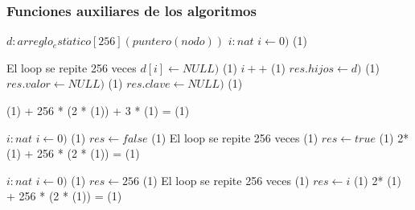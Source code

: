 





\subsubsection{Funciones auxiliares de los algoritmos}

  {
    \var $d : arreglo_est\acute{a}tico[256] (puntero(nodo))$
    \var $i : nat$
    \State $i \gets 0)$                									\comment \bigo(1)

     	\Statex             \comment El loop se repite 256 veces
     	\State $d[i] \gets NULL)$										\comment \bigo(1)
     	\State $i++$   													\comment \bigo(1) 
    \EndWhile						
    \State $res.hijos \gets d)$											\comment \bigo(1) 
    \State $res.valor \gets NULL)$   									\comment \bigo(1)
    \State $res.clave \gets NULL)$                    \comment \bigo(1) 
}{   \bigo(1) + 256 * (2 * \bigo(1)) + 3 * \bigo(1) = \bigo(1) }

  {
    \var $i : nat$
    \State $i \gets 0)$                									\comment \bigo(1)
    \State $res \gets false$										\comment \bigo(1)
     	\Statex             \comment El loop se repite 256 veces
 		                     			\comment \bigo(1)
		 	\State $res \gets true$										\comment \bigo(1)
     	 \EndIf	 													 
    \EndWhile						
}{  2* \bigo(1) + 256 * (2 * \bigo(1))  = \bigo(1) }

  {
    \var $i : nat$
    \State $i \gets 0)$                									\comment \bigo(1)
    \State $res \gets 256$												\comment \bigo(1)
     	\Statex             \comment El loop se repite 256 veces
 		                     			\comment \bigo(1)
		 	\State $res \gets i$										\comment \bigo(1)
     	 \EndIf	 													 
    \EndWhile						
}{  2* \bigo(1) + 256 * (2 * \bigo(1))  = \bigo(1) }

